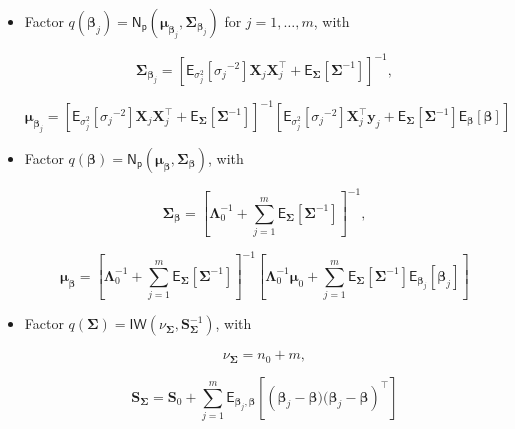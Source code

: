 \begin{itemize}
    \item Factor $q(\bm{\beta}_j)=\mathsf{N_p}(\bm{\mu}_{\bm{\beta}_j},\bm{\Sigma}_{\bm{\beta}_j})$  for $j=1,\dots,m$, with

\begin{equation}
\label{HLRM_CAVI_Sigma_Betaj}
\bm{\Sigma}_{\bm{\beta}_j} = \left[ \mathsf{E}_{\sigma^2_j}\left[{\sigma_j}^{-2}\right] \bm{X}_{j} \bm{X}_{j}^\top  + \mathsf{E}_{\bm{\Sigma}}\left[\bm{\Sigma}^{-1}\right]  \right]^{-1},
\end{equation}

\begin{equation}
\label{HLRM_CAVI_Mu_Betaj}
\bm{\mu}_{\bm{\beta}_j}= \left[ \mathsf{E}_{\sigma^2_j}\left[{\sigma_j}^{-2}\right] \bm{X}_{j} \bm{X}_{j}^\top  + \mathsf{E}_{\bm{\Sigma}}\left[\bm{\Sigma}^{-1}\right]  \right]^{-1}\left[\mathsf{E}_{\sigma^2_j}\left[{\sigma_j}^{-2}\right] \bm{X}_{j}^\top \bm{y}_{j} + \mathsf{E}_{\bm{\Sigma}}\left[\bm{\Sigma}^{-1}\right] \mathsf{E}_{\bm{\beta}}\left[\bm{\beta} \right] \right]
\end{equation}

\item Factor $q(\bm{\beta})=\mathsf{N_p}(\bm{\mu}_{\bm{\beta}},\bm{\Sigma}_{\bm{\beta}})$, with

\begin{equation}
\label{HLRM_CAVI_Sigma_Beta}
\bm{\Sigma}_{\bm{\beta}} = \left[\bm{\Lambda}_0^{-1}   + \sum_{j=1}^{m}\mathsf{E}_{\bm{\Sigma}}\left[\bm{\Sigma}^{-1}\right]  \right] ^{-1},
\end{equation}

\begin{equation}
\label{HLRM_CAVI_Mu_Beta}
\bm{\mu}_{\bm{\beta}}= \left[\bm{\Lambda}_0^{-1}   + \sum_{j=1}^{m}\mathsf{E}_{\bm{\Sigma}}\left[\bm{\Sigma}^{-1}\right]  \right]^{-1}\left[\bm{\Lambda}_0^{-1} \bm{\mu}_0 + \sum_{j=1}^{m}\mathsf{E}_{\bm{\Sigma}}\left[\bm{\Sigma}^{-1}\right] \mathsf{E}_{\bm{\beta}_j}\left[\bm{\beta}_j \right]\right]
\end{equation}

    \item Factor $q(\bm{\Sigma})=\mathsf{IW}(\nu_{\bm{\Sigma}},\bm{S}_{\bm{\Sigma}}^{-1})$, with

\begin{equation}
\label{HLRM_CAVI_nu_Sigma}
\nu_{\bm{\Sigma}} = n_0+m,
\end{equation}

\begin{equation}
\label{HLRM_CAVI_S_Sigma}
\bm{S}_{\bm{\Sigma}}=  \bm{S}_0 + \sum_{j=1}^{m} \mathsf{E}_{\bm{\beta}_j,\bm{\beta}}\left[\left(\bm{\beta}_j - \bm{\beta})(\bm{\beta}_j - \bm{\beta}\right)^\top\right]
\end{equation}
    

\end{itemize}
